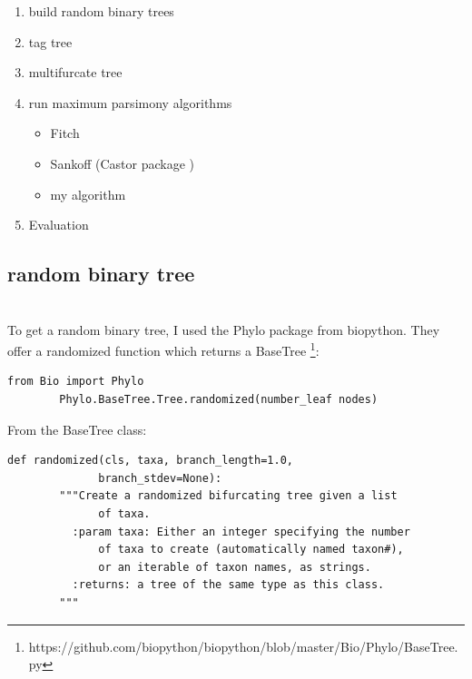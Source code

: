     \begin{enumerate}
      \item build random binary trees
      \item tag tree
      \item multifurcate tree
      \item run maximum parsimony algorithms
      \begin{itemize}
        \item Fitch
        \item Sankoff (Castor package \cite{Louca2017}) 
        \item my algorithm
      \end{itemize}
      \item Evaluation
    \end{enumerate}

    \subsection{random binary tree}
       \\
      To get a random binary tree, I used the Phylo package from biopython. They offer a randomized
        function which returns a BaseTree \footnote{
          https://github.com/biopython/biopython/blob/master/Bio/Phylo/BaseTree.py
        }:
      \begin{lstlisting}[gobble=6]
        from Bio import Phylo
        Phylo.BaseTree.Tree.randomized(number_leaf nodes)
      \end{lstlisting}
      From the BaseTree class:
      \begin{lstlisting}[gobble=6]
        def randomized(cls, taxa, branch_length=1.0, 
              branch_stdev=None):
        """Create a randomized bifurcating tree given a list
              of taxa.
          :param taxa: Either an integer specifying the number
              of taxa to create (automatically named taxon#), 
              or an iterable of taxon names, as strings.
          :returns: a tree of the same type as this class.
        """
      \end{lstlisting}

